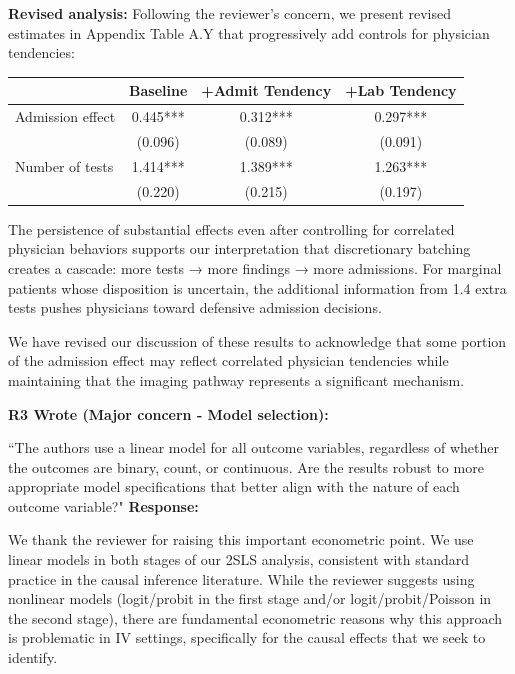 \documentclass[11pt]{article}
\newenvironment{quote2}
{ \bigskip
\noindent
         \small\em
         \baselineskip=14pt
}
\newcommand{\1}{\hbox{\rm 1\kern-.35em 1}}
\begin{document}
{\textbf{Revised analysis:}
Following the reviewer's concern, we present revised estimates in Appendix Table A.Y that progressively add controls for physician tendencies:

\begin{table}[h]
\centering
\begin{tabular}{lccc}
\toprule
& Baseline & +Admit Tendency & +Lab Tendency \\
\midrule
Admission effect & 0.445*** & 0.312*** & 0.297*** \\
& (0.096) & (0.089) & (0.091) \\
Number of tests & 1.414*** & 1.389*** & 1.263*** \\
& (0.220) & (0.215) & (0.197) \\
\bottomrule
\end{tabular}
\end{table}

The persistence of substantial effects even after controlling for correlated physician behaviors supports our interpretation that discretionary batching creates a cascade: more tests → more findings → more admissions. For marginal patients whose disposition is uncertain, the additional information from 1.4 extra tests pushes physicians toward defensive admission decisions.

We have revised our discussion of these results to acknowledge that some portion of the admission effect may reflect correlated physician tendencies while maintaining that the imaging pathway represents a significant mechanism.
\color{black}


\begin{quote2}
\textbf{R3 Wrote (Major concern -  Model selection):}  

\noindent``The authors use a linear model for all outcome variables, regardless of whether the outcomes are binary, count, or continuous. Are the results robust to more appropriate model specifications that better align with the nature of each outcome variable?"
\end{quote2}


\noindent\textbf{Response:} \color{blue} {We thank the reviewer for raising this important econometric point. We use linear models in both stages of our 2SLS analysis, consistent with standard practice in the causal inference literature. While the reviewer suggests using nonlinear models (logit/probit in the first stage and/or logit/probit/Poisson in the second stage), there are fundamental econometric reasons why this approach is problematic in IV settings, specifically for the causal effects that we seek to identify.

}}
\end{document}
